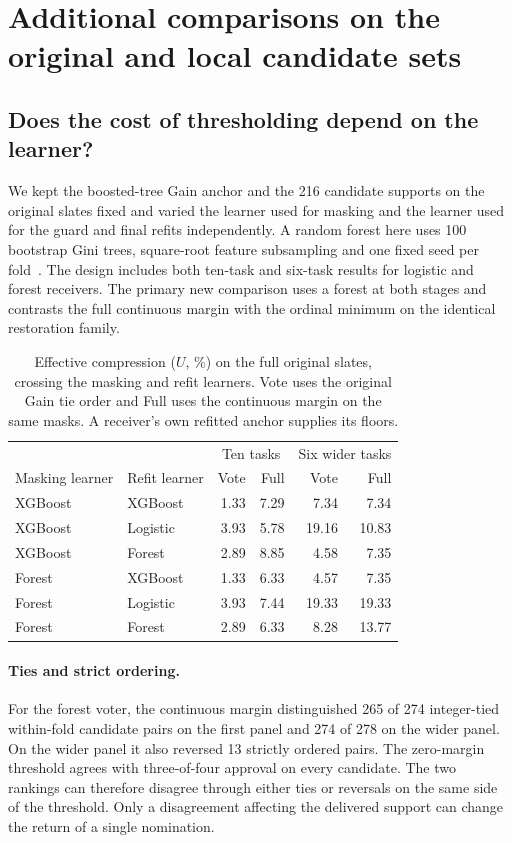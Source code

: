 \section{Additional comparisons on the original and local candidate sets}
\label{sec:forest-detail}
\subsection{Does the cost of thresholding depend on the learner?}
We kept the boosted-tree Gain anchor and the 216 candidate supports on the original slates fixed and varied the learner used for masking and the learner used for the guard and final refits independently. A random forest here uses 100 bootstrap Gini trees, square-root feature subsampling and one fixed seed per fold~\cite{breiman2001random}. The design includes both ten-task and six-task results for logistic and forest receivers. The primary new comparison uses a forest at both stages and contrasts the full continuous margin with the ordinal minimum on the identical restoration family.

\begin{table}[tb]
\centering\small
\caption{Effective compression ($U$, \%) on the full original slates, crossing the masking and refit learners. Vote uses the original Gain tie order and Full uses the continuous margin on the same masks. A receiver's own refitted anchor supplies its floors.}
\label{tab:forest-cross}
\begin{tabular}{@{}llrrrr@{}}
\toprule
 & & \multicolumn{2}{c}{Ten tasks} & \multicolumn{2}{c}{Six wider tasks}\\
Masking learner & Refit learner & Vote & Full & Vote & Full\\
\midrule
XGBoost & XGBoost & 1.33 & 7.29 & 7.34 & 7.34\\
XGBoost & Logistic & 3.93 & 5.78 & 19.16 & 10.83\\
XGBoost & Forest & 2.89 & 8.85 & 4.58 & 7.35\\
Forest & XGBoost & 1.33 & 6.33 & 4.57 & 7.35\\
Forest & Logistic & 3.93 & 7.44 & 19.33 & 19.33\\
Forest & Forest & 2.89 & 6.33 & 8.28 & 13.77\\
\bottomrule
\end{tabular}
\end{table}

\paragraph{Ties and strict ordering.}
For the forest voter, the continuous margin distinguished 265 of 274 integer-tied within-fold candidate pairs on the first panel and 274 of 278 on the wider panel. On the wider panel it also reversed 13 strictly ordered pairs. The zero-margin threshold agrees with three-of-four approval on every candidate. The two rankings can therefore disagree through either ties or reversals on the same side of the threshold. Only a disagreement affecting the delivered support can change the return of a single nomination.

